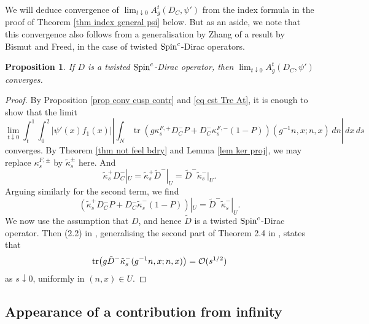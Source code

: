 \documentclass[11pt]{article}
\theoremstyle{plain}
\newtheorem{proposition}[theorem]{Proposition}
\theoremstyle{definition}
\theoremstyle{remark}
\numberwithin{equation}{section}
\DeclareMathOperator{\tr}{tr}
\begin{document}
We will deduce convergence of $\lim_{t\downarrow 0} A_{g}^t(D_C, \psi')$ from the index formula in the proof of Theorem \ref{thm index general psi} below. But as an aside, we note that this convergence also follows from a generalisation by Zhang of a result by Bismut and Freed, in the case of twisted $\operatorname{Spin}^c$-Dirac operators.
\begin{proposition}
If  $D$ is a twisted $\operatorname{Spin}^c$-Dirac operator, then $\lim_{t\downarrow 0} A_{g}^t(D_C, \psi')$ converges.
\end{proposition}
\begin{proof}
By Proposition \ref{prop conv cusp contr} and \eqref{eq est Tre At}, it is enough to show
 that the limit
\[
\lim_{t\downarrow 0}
  \int_t^{1} \int_0^2  |\psi'(x) f_1(x)| \left| \int_N
  \tr \left(g\kappa_s^{F, +}D_C^- P + D_C^-\kappa_s^{F, -}(1- P)\right) (g^{-1}n, x;  n, x)\, dn \right| \,dx \, ds
\]
converges. By Theorem \ref{thm not feel bdry} and Lemma \ref{lem ker proj}, we may replace $\kappa_s^{F, \pm}$ by $\tilde \kappa_s^{\pm}$ here.
And
\[
\tilde \kappa_s^+ D_C^- |_U = \tilde \kappa_s^+ \tilde D^-|_U = \tilde D^-  \tilde \kappa_s^- |_U.
\]
Arguing similarly for the second term, we find
%
%
\[
\left(
\tilde \kappa_s^{+}D_C^- P + D_C^-\tilde \kappa_s^{-}(1- P)\right) |_U =
\tilde D^- \tilde  \kappa_s^{-}|_U.
\]
We now use the assumption that $D$, and hence $\tilde D$ is a twisted $\operatorname{Spin}^c$-Dirac operator. Then (2.2) in \cite{Zhang90}, generalising the second part of Theorem 2.4 in \cite{Bismut86}, states that
\[
\tr  \bigl( g\tilde D^- \tilde \kappa_s^{-} (g^{-1}n, x;  n, x)\bigr) = \cO(s^{1/2})
\]
as $s \downarrow 0$, uniformly in $(n,x) \in U$.
\end{proof}


\subsection{Appearance of a contribution from infinity}
\end{document}
